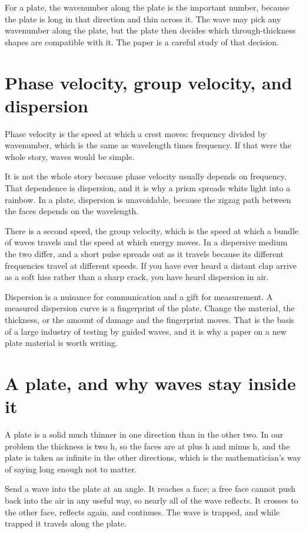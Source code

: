 \documentclass[11pt]{article}
\begin{document}
For a plate, the wavenumber along the plate is the important number, because the plate is long in that
direction and thin across it. The wave may pick any wavenumber along the plate, but the plate then decides
which through-thickness shapes are compatible with it. The paper is a careful study of that decision.

\section{Phase velocity, group velocity, and dispersion}

Phase velocity is the speed at which a crest moves: frequency divided by wavenumber, which is the same as
wavelength times frequency. If that were the whole story, waves would be simple.

It is not the whole story because phase velocity usually depends on frequency. That dependence is dispersion,
and it is why a prism spreads white light into a rainbow. In a plate, dispersion is unavoidable, because the
zigzag path between the faces depends on the wavelength.

There is a second speed, the group velocity, which is the speed at which a bundle of waves travels and the
speed at which energy moves. In a dispersive medium the two differ, and a short pulse spreads out as it
travels because its different frequencies travel at different speeds. If you have ever heard a distant clap
arrive as a soft hiss rather than a sharp crack, you have heard dispersion in air.

Dispersion is a nuisance for communication and a gift for measurement. A measured dispersion curve is a
fingerprint of the plate. Change the material, the thickness, or the amount of damage and the fingerprint
moves. That is the basis of a large industry of testing by guided waves, and it is why a paper on a new plate
material is worth writing.

\section{A plate, and why waves stay inside it}

A plate is a solid much thinner in one direction than in the other two. In our problem the thickness is two
h, so the faces are at plus h and minus h, and the plate is taken as infinite in the other directions, which
is the mathematician's way of saying long enough not to matter.

Send a wave into the plate at an angle. It reaches a face; a free face cannot push back into the air in any
useful way, so nearly all of the wave reflects. It crosses to the other face, reflects again, and continues.
The wave is trapped, and while trapped it travels along the plate.
\end{document}
